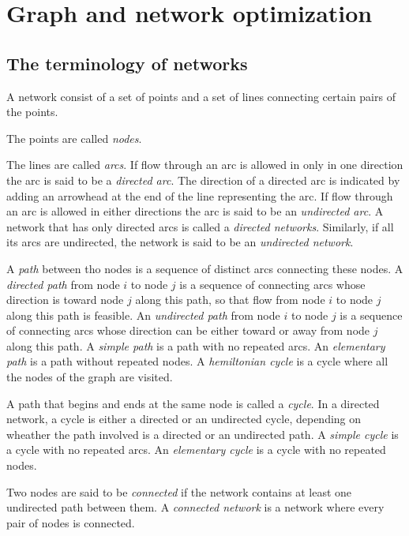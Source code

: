 \documentclass[12pt, a4paper]{report}
\newtheorem[style=M,bodystyle=\normalfont]{theorem}{Theorem}
\newtheorem[style=M,bodystyle=\normalfont]{corollary}{Corollary}
\newtheorem[style=M,bodystyle=\normalfont]{lemma}{Lemma}
\newtheorem[style=M,bodystyle=\normalfont]{definition}{Definition}
\begin{document}
\newpage

\chapter{Graph and network optimization}
\section{The terminology of networks}
A network consist of a set of points and a set of lines connecting certain pairs of the points.
\begin{remark}
    The points are called \emph{nodes}. 
\end{remark}
\begin{remark}
    The lines are called \emph{arcs}. If flow through an arc is allowed in only in one direction the arc is said to be a 
    \emph{directed arc}. The direction of a directed arc is indicated by adding an arrowhead at the end of the line representing the arc. 
    If flow through an arc is allowed in either directions the arc is said to be an \emph{undirected arc}.
    A network that has only directed arcs is called a \emph{directed networks}. Similarly, if all its arcs are undirected,
    the network is said to be an \emph{undirected network}. 
\end{remark}
\begin{remark}
    A \emph{path} between tho nodes is a sequence of distinct arcs connecting these nodes. A \emph{directed path} from node $i$ to
    node $j$ is a sequence of connecting arcs whose direction is toward node $j$ along this path, so that flow from node $i$ to node
    $j$ along this path is feasible. An \emph{undirected path} from node $i$ to node $j$ is a sequence of connecting arcs whose 
    direction can be either toward or away from node $j$ along this path. A \emph{simple path} is a path with no repeated arcs. 
    An \emph{elementary path} is a path without repeated nodes. A \emph{hemiltonian cycle} is a cycle where all the nodes of the graph 
    are visited.
\end{remark}
\begin{remark}
    A path that begins and ends at the same node is called a \emph{cycle}. In a directed network, a cycle is either a directed or an
    undirected cycle, depending on wheather the path involved is a directed or an undirected path. A \emph{simple cycle} is a cycle with no repeated arcs.
    An \emph{elementary cycle} is a cycle with no repeated nodes.
\end{remark}
\begin{remark}
    Two nodes are said to be \emph{connected} if the network contains at least one undirected path between them. A \emph{connected network} 
    is a network where every pair of nodes is connected.
\end{remark}
\end{document}
